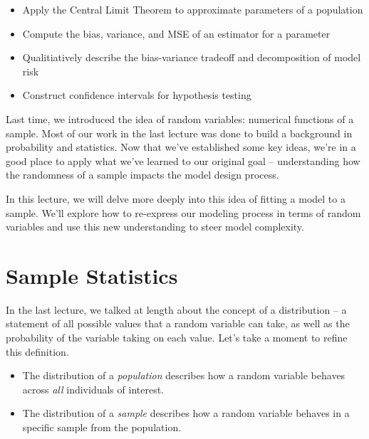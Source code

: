 \documentclass[
  letterpaper,
  DIV=11,
  numbers=noendperiod]{scrreprt}
\providecommand{\tightlist}{%
  \setlength{\itemsep}{0pt}\setlength{\parskip}{0pt}}\usepackage{longtable,booktabs,array}
\begin{document}
\begin{tcolorbox}[enhanced jigsaw, bottomrule=.15mm, breakable, colbacktitle=quarto-callout-note-color!10!white, coltitle=black, opacitybacktitle=0.6, colback=white, bottomtitle=1mm, toprule=.15mm, title=\textcolor{quarto-callout-note-color}{\faInfo}\hspace{0.5em}{Note}, titlerule=0mm, arc=.35mm, leftrule=.75mm, toptitle=1mm, colframe=quarto-callout-note-color-frame, rightrule=.15mm, opacityback=0, left=2mm]

\begin{itemize}
\tightlist
\item
  Apply the Central Limit Theorem to approximate parameters of a
  population
\item
  Compute the bias, variance, and MSE of an estimator for a parameter
\item
  Qualitiatively describe the bias-variance tradeoff and decomposition
  of model risk
\item
  Construct confidence intervals for hypothesis testing
\end{itemize}

\end{tcolorbox}

Last time, we introduced the idea of random variables: numerical
functions of a sample. Most of our work in the last lecture was done to
build a background in probability and statistics. Now that we've
established some key ideas, we're in a good place to apply what we've
learned to our original goal -- understanding how the randomness of a
sample impacts the model design process.

In this lecture, we will delve more deeply into this idea of fitting a
model to a sample. We'll explore how to re-express our modeling process
in terms of random variables and use this new understanding to steer
model complexity.

\hypertarget{sample-statistics}{%
\section{Sample Statistics}\label{sample-statistics}}

In the last lecture, we talked at length about the concept of a
distribution -- a statement of all possible values that a random
variable can take, as well as the probability of the variable taking on
each value. Let's take a moment to refine this definition.

\begin{itemize}
\tightlist
\item
  The distribution of a \emph{population} describes how a random
  variable behaves across \emph{all} individuals of interest.
\item
  The distribution of a \emph{sample} describes how a random variable
  behaves in a specific sample from the population.
\end{itemize}
\end{document}
